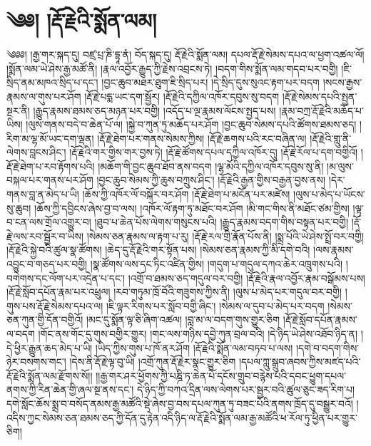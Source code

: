 \setcounter{footnote}{0} 
\chapter{༄༅། །རྡོ་རྗེའི་སྨོན་ལམ།}༄༅༅། །རྒྱ་གར་སྐད་དུ། བཛྲ་པྲ་ཎི་དྷཱ་ནཾ། བོད་སྐད་དུ། རྡོ་རྗེའི་སྨོན་ལམ། དཔལ་རྡོ་རྗེ་སེམས་དཔའ་ལ་ཕྱག་འཚལ་ལོ། །སྨོན་ལམ་ཡེ་ཤེས་རྒྱ་མཚོ་ནི། །རྣལ་འབྱོར་རྒྱུད་ཀྱི་རྗེས་འབྲངས་ཏེ། །བདག་གིས་སྨོན་ལམ་གདབ་པར་བགྱི། །ཇི་སྲིད་ནམ་མཁའ་སྲིད་པ་དང་། །བྱང་ཆུབ་མཐར་ཐུག་ཇི་སྲིད་པར། །དེ་སྲིད་དུས་སུའང་རྟག་པར་བདག །སངས་རྒྱས་རྣམས་ལ་གུས་པར་ཤོག །རྡོ་རྗེ་པདྨ་ཡང་དག་སྦྱོར། །རྡོ་རྗེའི་དཀྱིལ་འཁོར་དབུས་སུ་བདག །རྡོ་རྗེ་སེམས་དཔའི་སྤྱན་སྔར་ནི། །རྒྱུད་རྣམས་ཐམས་ཅད་མཉན་པར་བགྱི། །འདོད་པ་ལྔ་རྣམས་ལོངས་སྤྱད་པས། །རྣམ་བཀྲ་རྡོ་རྗེའི་མཆོད་པ་ཡིས། །ལུས་གནས་བདེ་བ་ཆེན་པོ་ལ། །སྐྱེ་བ་ཀུན་ཏུ་མཆོད་པར་ཤོག །བྱང་ཆུབ་སེམས་དཔའི་ཚོགས་ཐམས་ཅད། །རིག་མ་ལྷ་མོ་ཡང་དག་ལྡན། །རྡོ་རྗེ་ཐེག་པར་གནས་སེམས་ཀྱིས། །རྡོ་རྗེ་ཆགས་པའི་རང་བཞིན་ལ། །རྡོ་རྗེའི་གླུ་ནི་ལེགས་བླངས་ཤིང་། །རྡོ་རྗེའི་གར་གྱིས་གར་བྱས་ཏེ། །རྡོ་རྗེ་ཚོགས་དཔལ་དཀྱིལ་འཁོར་དུ། །རྡོ་རྗེ་རོལ་པ་དག་བགྱིའོ། །རྡོ་རྗེ་ཐེག་པ་རབ་རྟོགས་པའི། །མཆོག་གི་བྱང་ཆུབ་ཐོབ་ནས་བདག །ལྷ་མོའི་དཀྱིལ་འཁོར་དབུས་སུ་ནི། །མ་ལུས་བསྐལ་པར་གནས་པར་ཤོག །བྱང་ཆུབ་སེམས་ཀྱི་ཆུས་བཀྲུས་ཤིང་། །རྡོ་རྗེའི་རྒྱན་གྱིས་བརྒྱན་བྱས་ནས། །དེར་གནས་བླ་ན་མེད་པ་ཡི། །ཆོས་ཀྱི་འཁོར་ལོ་བསྐོར་བར་ཤོག །རྡོ་རྗེ་ཐེག་པ་མངོན་པར་མཛེས། །ལུས་པ་མེད་པ་ཡོངས་སུ་ཆུབ། །ཆོས་ཀྱི་དབྱིངས་ཞེས་བྱ་བ་ལས། །འཁོར་ལོ་རྟག་ཏུ་མཐོང་བར་ཤོག །མི་གང་གིས་ནི་མཐོང་ཙམ་གྱིས། །ལྟ་བ་ངན་ལས་གྲོལ་འགྱུར་བ། །ཐུབ་པ་ཆེན་པོས་ལེགས་གསུངས་པའི། །རྒྱུད་རྣམས་བདག་གིས་བསྟན་པར་བགྱི། །རྡོ་རྗེ་ལས་རབ་སྦྱོར་བ་ཡིས། །སེམས་ཅན་རྣམས་ལ་རྟག་པ་རུ། །རྡོ་རྗེ་རལ་གྲི་རྣོན་པོས་ནི། །སྨྲ་པོའི་ཡེ་ཤེས་སྤྲོ་བར་བགྱི། །རྡོ་རྗེའི་སྐྱེ་བའི་ཚུལ་སྣ་ཚོགས། །ཆེད་དུ་རྡོ་རྗེའི་གར་སྟོན་པས། །སེམས་ཅན་རྣམས་ཀྱི་མི་དགེ་བའི། །ལས་རྣམས་འབྱུང་བ་གཅད་པར་བགྱི། །སྣ་ཚོགས་ལས་དང་ཏིང་འཛིན་གྱིས། །གདུག་པ་གདུལ་དཀའ་ཆེར་འཁྲུགས་པའི། །བགེགས་དང་ལོག་པར་འདྲེན་པ་དང་། །འགྲོ་བ་ཐམས་ཅད་གདུལ་བར་བགྱི། །རྡོ་རྗེའི་རྣལ་འབྱོར་རྣམ་བསྒོམས་པས། །རྡོ་རྗེ་སློབ་དཔོན་རྣམ་པར་འཕྲུལ། །རབ་གཏུམ་ཁྲོ་བོའི་གཟུགས་ཀྱིས་ནི། །ལུས་པ་མེད་པར་གདུལ་བར་བགྱི། །
གུས་པས་རྡོ་རྗེ་སེམས་དཔའ་ལ། །ཇི་ལྟར་རིགས་པར་སློབ་བགྱི་ཞིང་། །སེམས་ལ་དུབ་པ་མེད་པར་བདག །སེམས་ཅན་ཀུན་གྱི་དོན་བགྱིའོ། །མང་དུ་སྨོན་ལྟ་ཅི་ཞིག་འཚལ། །བླ་མ་ལ་བདག་གུས་གྱུར་ཅིག །རྡོ་རྗེ་སློབ་དཔོན་རྣམས་ལ་བདག །གོང་ནས་གོང་དུ་གུས་བགྱིར་གྱུར། །གང་ལས་གཉིས་དབྱེ་ཀུན་བྲལ་བའི། །དེ་ཉིད་ཡེ་ཤེས་འཐོབ་ཉིད་ན། །དེ་ཕྱིར་རྒྱུན་ཆད་མེད་པ་ཡི། །ཡིད་ཀྱིས་གུས་པ་ཁོ་ནར་ཤོག །རྡོ་རྗེའི་སྨོན་ལམ་བཏབ་པ་ལས། །དགེ་བ་བདག་གིས་ཉེར་བསགས་གང་། །དེས་ནི་རྡོ་རྗེ་ལྟ་བུ་ཡི། །འགྲོ་ཀུན་རྡོ་རྗེར་སྣང་གྱུར་ཅིག །དཔལ་ཀླུ་སྒྲུབ་ཞབས་ཀྱིས་མཛད་པའི་རྡོ་རྗེའི་སྨོན་ལམ་རྫོགས་སོ།། །།རྒྱ་གར་ཤར་ཕྱོགས་ཀྱི་པཎྜི་ཏ་ཆེན་པོ་དངོས་གྲུབ་བརྙེས་པའི་དབང་ཕྱུག་དཔལ་ནགས་ཀྱི་རིན་ཆེན་གྱི་ཞལ་སྔ་ནས་དང་། དེ་ཉིད་ཀྱི་བཀའ་དྲིན་ལས་ལེགས་པར་སྦྱར་བའི་ཚུལ་ཅུང་ཟད་རིག་པ། དགེ་སློང་ཆོས་སྨྲ་བ་བསོད་ནམས་རྒྱ་མཚོའི་སྡེ་ཞེས་བྱ་བས་དཔལ་ཀུན་ཏུ་བཟང་པོའི་ནགས་ཁྲོད་དུ་བསྒྱུར་བའོ། །འདིས་ཀྱང་སེམས་ཅན་ཐམས་ཅད་ཀྱི་དོན་དུ་རྟེན་འདི་ཉིད་ལ་རྡོ་རྗེའི་སྨོན་ལམ་རྒྱ་མཚོའི་ཕ་རོལ་ཏུ་ཕྱིན་པར་གྱུར་ཅིག། 